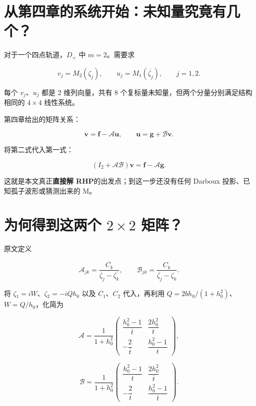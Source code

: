 \section{从第四章的系统开始：未知量究竟有几个？}

对于一个四点轨道，$D_{+}$ 中 $m=2$。需要求\par

\[
v_j=M_2(\zeta_j),\qquad
u_j=M_1(\overline{\zeta_j}),\qquad j=1,2.
\]

每个 $v_j$、$u_j$ 都是 2 维列向量，共有 8 个复标量未知量，但两个分量分别满足结构相同的 $4\times{}4$ 线性系统。\par

第四章给出的矩阵关系：\par

\[
\boldsymbol v=\boldsymbol f-\mathcal A\boldsymbol u,
\qquad
\boldsymbol u=\boldsymbol g+\mathcal B\boldsymbol v.
\]

将第二式代入第一式：\par

\[
(I_2+\mathcal A\mathcal B)\boldsymbol v
=\boldsymbol f-\mathcal A\boldsymbol g.
\]

这就是本文真正\textbf{直接解 RHP}的出发点；到这一步还没有任何 Darboux 投影、已知孤子波形或猜测出来的 M。\par

\section{为何得到这两个 \texorpdfstring{$2\times 2$}{2x2} 矩阵？}
\par

原文定义\par

\[
\mathcal A_{jk}=\dfrac{\overline{C_k}}{\zeta_j-\overline{\zeta_k}},
\qquad
\mathcal B_{jk}=\dfrac{C_k}{\overline{\zeta_j}-\zeta_k}.
\]

将 $\zeta{}_{1}=iW$、$\zeta{}_{2}=-iQh_{0}$ 以及 $C_{1}$、$C_{2}$ 代入，再利用 $Q=2bh_{0}/(1+h_{0}^{2})$、$W=Q/h_{0}$，化简为\par

\[
\mathcal A=\dfrac{1}{1+h_0^2}
\begin{pmatrix}
\dfrac{h_0^2-1}{\overline t}&\dfrac{2h_0^2}{t}\\
-\dfrac{2}{\overline t}&\dfrac{h_0^2-1}{t}
\end{pmatrix},
\]

\[
\mathcal B=\dfrac{1}{1+h_0^2}
\begin{pmatrix}
\dfrac{h_0^2-1}{t}&\dfrac{2h_0^2}{\overline t}\\
-\dfrac{2}{t}&\dfrac{h_0^2-1}{\overline t}
\end{pmatrix}.
\]

